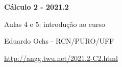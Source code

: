 \documentclass[oneside,12pt]{article}
\begin{document}
\def\Sthree{
  \iequationbox {\Intx{a}{b}{f(g(x))g'(x)}}
                {\Intu{g(a)}{g(b)}{f(u)}}
}
\def\SthreeI{
  \iequationbox {\intx{f(g(x))g'(x)}}
                {\intu{f(u)}
                 \qquad [u=g(x)]
                }
}

\def\Sthree{
  \pmat{
    \D \Intx{a}{b}{f(g(x))g'(x)} \\
    \veq \\
    \D \Intu{g(a)}{g(b)}{f(u)}
  }}

\def\SthreeI{
  \pmat{
    \D \intx{f(g(x))g'(x)} \\
       \veq \\
    \D \intu{f(u)} \\
    \text{Obs: $u=g(x)$.} \\
  }}



\def\Subst#1{\bmat{#1}}



%

\thispagestyle{empty}

\begin{center}

\vspace*{1.2cm}

{\bf \Large Cálculo 2 - 2021.2}

\bsk

Aulas 4 e 5: introdução ao curso

\bsk

Eduardo Ochs - RCN/PURO/UFF

\url{http://angg.twu.net/2021.2-C2.html}

\end{center}

\newpage

%                                                        
\end{document}
